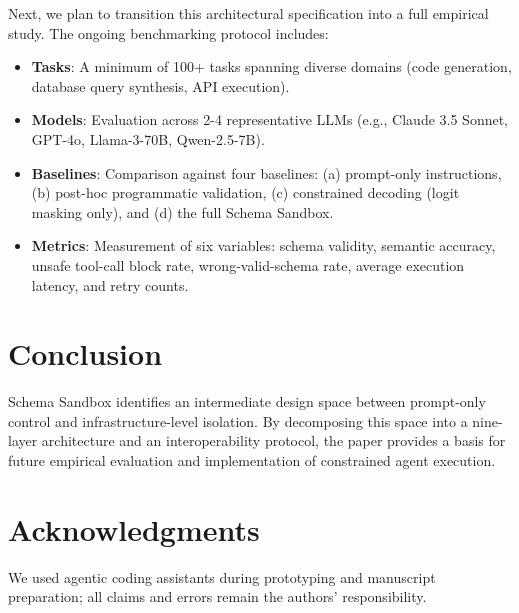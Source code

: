 \documentclass[10pt,journal,compsoc]{IEEEtran}
\begin{document}
Next, we plan to transition this architectural specification into a full empirical study. The ongoing benchmarking protocol includes:
\begin{itemize}
  \item \textbf{Tasks}: A minimum of 100+ tasks spanning diverse domains (code generation, database query synthesis, API execution).
  \item \textbf{Models}: Evaluation across 2-4 representative LLMs (e.g., Claude 3.5 Sonnet, GPT-4o, Llama-3-70B, Qwen-2.5-7B).
  \item \textbf{Baselines}: Comparison against four baselines: (a) prompt-only instructions, (b) post-hoc programmatic validation, (c) constrained decoding (logit masking only), and (d) the full Schema Sandbox.
  \item \textbf{Metrics}: Measurement of six variables: schema validity, semantic accuracy, unsafe tool-call block rate, wrong-valid-schema rate, average execution latency, and retry counts.
\end{itemize}


\section{Conclusion}
Schema Sandbox identifies an intermediate design space between prompt-only control and infrastructure-level isolation. By decomposing this space into a nine-layer architecture and an interoperability protocol, the paper provides a basis for future empirical evaluation and implementation of constrained agent execution.


\section*{Acknowledgments}
We used agentic coding assistants during prototyping and manuscript preparation; all claims and errors remain the authors' responsibility.
\end{document}
